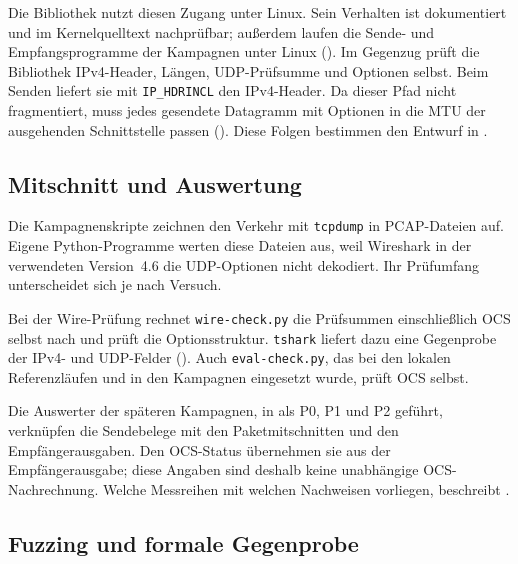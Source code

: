 Die Bibliothek nutzt diesen Zugang unter Linux. Sein Verhalten ist dokumentiert und im Kernelquelltext
nachprüfbar; außerdem laufen die Sende- und Empfangs\-programme der Kampagnen unter Linux
(). Im Gegenzug prüft die Bibliothek IPv4-Header, Längen, UDP-Prüfsumme und
Optionen selbst.
Beim Senden liefert sie mit \texttt{IP\_HDRINCL} den IPv4-Header. Da dieser Pfad nicht fragmentiert, muss
jedes gesendete Datagramm mit Optionen in die MTU der ausgehenden Schnittstelle passen ().
Diese Folgen bestimmen den Entwurf in .

\subsection{Mitschnitt und Auswertung}
\label{subsec:mitschnittwerkzeuge}

Die Kampagnenskripte zeichnen den Verkehr mit \texttt{tcpdump} in PCAP-Dateien auf. Eigene Python-Programme
werten diese Dateien aus, weil Wireshark in der verwendeten Version~4.6 die UDP-Optionen nicht dekodiert.
Ihr Prüfumfang unterscheidet sich je nach Versuch.

Bei der Wire-Prüfung rechnet \texttt{wire-check.py} die Prüfsummen einschließlich OCS selbst nach und
prüft die Options\-struktur. \texttt{tshark} liefert dazu eine Gegenprobe der IPv4- und UDP-Felder
(). Auch \texttt{eval-check.py}, das bei den lokalen Referenzläufen und in den
Kampagnen eingesetzt wurde, prüft OCS selbst.

Die Auswerter der späteren Kampagnen, in  als P0, P1 und P2 geführt, verknüpfen
die Sendebelege mit den Paketmitschnitten und den Empfänger\-ausgaben.
Den OCS-Status übernehmen sie aus der Empfänger\-ausgabe; diese Angaben sind deshalb keine
unabhängige OCS-Nachrechnung. Welche Messreihen mit welchen Nachweisen vorliegen, beschreibt
.

\subsection{Fuzzing und formale Gegenprobe}
\label{subsec:formale-gegenprobe}

